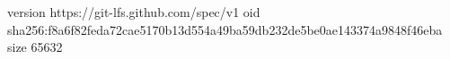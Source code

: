 version https://git-lfs.github.com/spec/v1
oid sha256:f8a6f82feda72cae5170b13d554a49ba59db232de5be0ae143374a9848f46eba
size 65632
